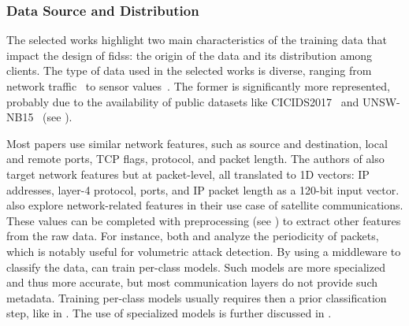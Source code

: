 \begin{table}[]
  \centering
  \caption{
    Comparative overview of selected works in the original study---approach and objectives (1/2)%
    \label{tbl:sota.comp}%
  }%
  \resizebox{\textwidth}{!}{}
\end{table}


\subsubsection{Data Source and Distribution\label{sec:sota.quali.data}}

The selected works highlight two main characteristics of the training data that impact the design of \glspl{fids}: the origin of the data and its distribution among clients.
The type of data used in the selected works is diverse, ranging from network traffic~\cite{chen_Networkanomalydetection_2020,rathore_BlockSecIoTNetBlockchainbaseddecentralized_2019} to sensor values~\cite{zhang_BlockchainbasedFederatedLearning_2020,schneble_Attackdetectionusing_2019}.
The former is significantly more represented, probably due to the availability of public datasets like CICIDS2017~\cite{sharafaldin_GeneratingNewIntrusion_2018} and UNSW-NB15~\cite{moustafa_UNSWNB15comprehensivedata_2015} (see ).

Most papers \cite{chen_Networkanomalydetection_2020,rathore_BlockSecIoTNetBlockchainbaseddecentralized_2019,nguyen_DIoTFederatedSelflearning_2019,li_DeepFedFederatedDeep_2020,rahman_InternetThingsIntrusion_2020,sun_IntrusionDetectionSegmented_2020,popoola_FederatedDeepLearning_2021a,hei_trustedfeatureaggregator_2020} use similar network features, such as source and destination, local and remote ports, TCP flags, protocol, and packet length.
The authors of \cite{qin_LineSpeedScalableIntrusion_2020a} also target network features but at packet-level, all translated to 1D vectors: IP addresses, layer-4 protocol, ports, and IP packet length as a 120-bit input vector.
\textcite{li_DeepFedFederatedDeep_2020} also explore network-related features in their use case of satellite communications.
These values can be completed with preprocessing (see ) to extract other features from the raw data.
For instance, both \textcite{pahl_AllEyesYou_2018} and \textcite{nguyen_DIoTFederatedSelflearning_2019} analyze the periodicity of packets, which is notably useful for volumetric attack detection.
By using a middleware to classify the data, \textcite{pahl_AllEyesYou_2018} can train per-class models.
Such models are more specialized and thus more accurate, but most communication layers do not provide such metadata.
Training per-class models usually requires then a prior classification step, like in \cite{nguyen_DIoTFederatedSelflearning_2019}.
The use of specialized models is further discussed in .

